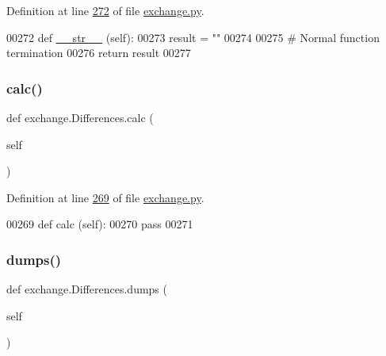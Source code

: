 Definition at line \hyperlink{exchange_8py_source_l00272}{272} of file \hyperlink{exchange_8py_source}{exchange.\+py}.


\begin{DoxyCode}
00272     \textcolor{keyword}{def }\hyperlink{namespacerates_a2f1a70c33ee9e255938e4c19fd207264}{\_\_str\_\_} (self):
00273         result = \textcolor{stringliteral}{""} 
00274         
00275         \textcolor{comment}{# Normal function termination}
00276         \textcolor{keywordflow}{return} result
00277     
\end{DoxyCode}
\mbox{\label{classexchange_1_1_differences_abf44b47cfb95a1f4eadfb99f4f8f5468}} 
\subsubsection{\texorpdfstring{calc()}{calc()}}
{\footnotesize\ttfamily def exchange.\+Differences.\+calc (\begin{DoxyParamCaption}\item[{}]{self }\end{DoxyParamCaption})}



Definition at line \hyperlink{exchange_8py_source_l00269}{269} of file \hyperlink{exchange_8py_source}{exchange.\+py}.


\begin{DoxyCode}
00269     \textcolor{keyword}{def }calc (self):
00270         \textcolor{keywordflow}{pass}
00271     
\end{DoxyCode}
\mbox{\label{classexchange_1_1_differences_adf6009f54dd9051816afd1d0713b9e90}} 
\subsubsection{\texorpdfstring{dumps()}{dumps()}}
{\footnotesize\ttfamily def exchange.\+Differences.\+dumps (\begin{DoxyParamCaption}\item[{}]{self }\end{DoxyParamCaption})}



